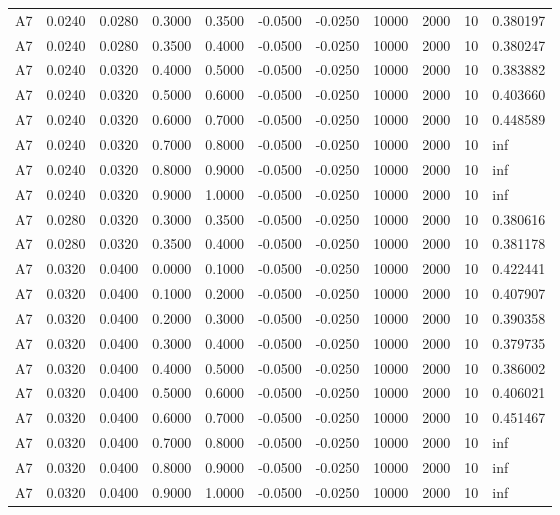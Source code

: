 \documentclass{article}
\begin{document}
\begin{longtable}{l r r r r r r r r r l}
A7 & 0.0240 & 0.0280 & 0.3000 & 0.3500 & -0.0500 & -0.0250 & 10000 & 2000 & 10 & 0.380197 \\
A7 & 0.0240 & 0.0280 & 0.3500 & 0.4000 & -0.0500 & -0.0250 & 10000 & 2000 & 10 & 0.380247 \\
A7 & 0.0240 & 0.0320 & 0.4000 & 0.5000 & -0.0500 & -0.0250 & 10000 & 2000 & 10 & 0.383882 \\
A7 & 0.0240 & 0.0320 & 0.5000 & 0.6000 & -0.0500 & -0.0250 & 10000 & 2000 & 10 & 0.403660 \\
A7 & 0.0240 & 0.0320 & 0.6000 & 0.7000 & -0.0500 & -0.0250 & 10000 & 2000 & 10 & 0.448589 \\
A7 & 0.0240 & 0.0320 & 0.7000 & 0.8000 & -0.0500 & -0.0250 & 10000 & 2000 & 10 & inf \\
A7 & 0.0240 & 0.0320 & 0.8000 & 0.9000 & -0.0500 & -0.0250 & 10000 & 2000 & 10 & inf \\
A7 & 0.0240 & 0.0320 & 0.9000 & 1.0000 & -0.0500 & -0.0250 & 10000 & 2000 & 10 & inf \\
A7 & 0.0280 & 0.0320 & 0.3000 & 0.3500 & -0.0500 & -0.0250 & 10000 & 2000 & 10 & 0.380616 \\
A7 & 0.0280 & 0.0320 & 0.3500 & 0.4000 & -0.0500 & -0.0250 & 10000 & 2000 & 10 & 0.381178 \\
A7 & 0.0320 & 0.0400 & 0.0000 & 0.1000 & -0.0500 & -0.0250 & 10000 & 2000 & 10 & 0.422441 \\
A7 & 0.0320 & 0.0400 & 0.1000 & 0.2000 & -0.0500 & -0.0250 & 10000 & 2000 & 10 & 0.407907 \\
A7 & 0.0320 & 0.0400 & 0.2000 & 0.3000 & -0.0500 & -0.0250 & 10000 & 2000 & 10 & 0.390358 \\
A7 & 0.0320 & 0.0400 & 0.3000 & 0.4000 & -0.0500 & -0.0250 & 10000 & 2000 & 10 & 0.379735 \\
A7 & 0.0320 & 0.0400 & 0.4000 & 0.5000 & -0.0500 & -0.0250 & 10000 & 2000 & 10 & 0.386002 \\
A7 & 0.0320 & 0.0400 & 0.5000 & 0.6000 & -0.0500 & -0.0250 & 10000 & 2000 & 10 & 0.406021 \\
A7 & 0.0320 & 0.0400 & 0.6000 & 0.7000 & -0.0500 & -0.0250 & 10000 & 2000 & 10 & 0.451467 \\
A7 & 0.0320 & 0.0400 & 0.7000 & 0.8000 & -0.0500 & -0.0250 & 10000 & 2000 & 10 & inf \\
A7 & 0.0320 & 0.0400 & 0.8000 & 0.9000 & -0.0500 & -0.0250 & 10000 & 2000 & 10 & inf \\
A7 & 0.0320 & 0.0400 & 0.9000 & 1.0000 & -0.0500 & -0.0250 & 10000 & 2000 & 10 & inf \\

\end{longtable}
\end{document}
